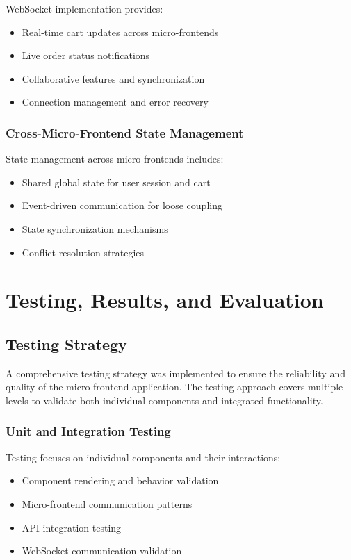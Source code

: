 \documentclass[12pt,a4paper]{report}
\begin{document}
WebSocket implementation provides:
\begin{itemize}
    \item Real-time cart updates across micro-frontends
    \item Live order status notifications
    \item Collaborative features and synchronization
    \item Connection management and error recovery
\end{itemize}

\subsection{Cross-Micro-Frontend State Management}

State management across micro-frontends includes:
\begin{itemize}
    \item Shared global state for user session and cart
    \item Event-driven communication for loose coupling
    \item State synchronization mechanisms
    \item Conflict resolution strategies
\end{itemize}

\chapter{Testing, Results, and Evaluation}
\section{Testing Strategy}

A comprehensive testing strategy was implemented to ensure the reliability and quality of the micro-frontend application. The testing approach covers multiple levels to validate both individual components and integrated functionality.

\subsection{Unit and Integration Testing}

Testing focuses on individual components and their interactions:
\begin{itemize}
    \item Component rendering and behavior validation
    \item Micro-frontend communication patterns
    \item API integration testing
    \item WebSocket communication validation
\end{itemize}
\end{document}
